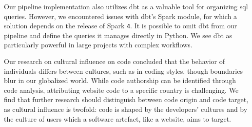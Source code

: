 Our pipeline implementation also utilizes dbt as a valuable tool for organizing \ac{sql} queries.
However, we encountered issues with dbt's Spark module, for which a solution depends on the release of Spark \texttt{4}.
It is possible to omit dbt from our pipeline and define the queries it manages directly in Python.
We see dbt as particularly powerful in large projects with complex workflows.

Our research on cultural influence on code concluded that the behavior of individuals differs between cultures, such as in coding styles, though boundaries blur in our globalized world.
While code authorship can be identified through code analysis, attributing website code to a specific country is challenging.
We find that further research should distinguish between code origin and code target, as cultural influence is twofold: code is shaped by the developers' cultures and by the culture of users which a software artefact, like a website, aims to target.
